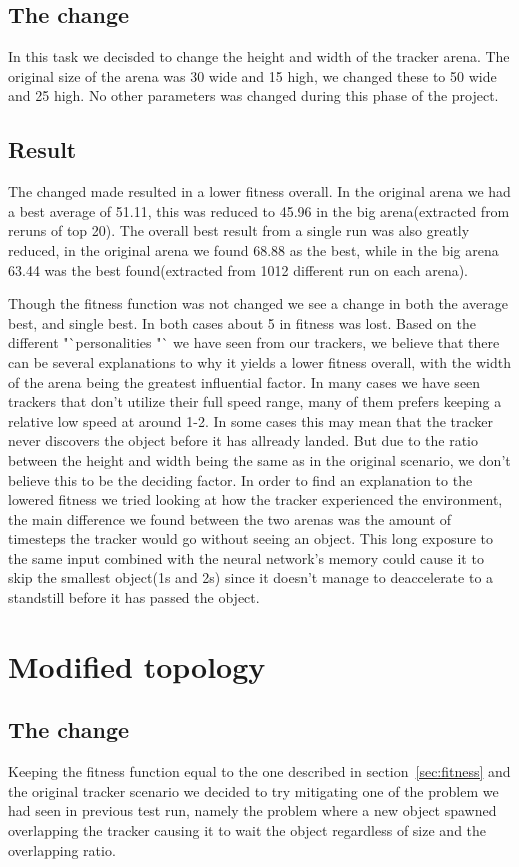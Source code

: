 \documentclass[10pt]{article}
\begin{document}
	\subsection{The change}
		In this task we decisded to change the height and width of the tracker arena. The original size of the arena was 30 wide and 15 high, we changed these to 50 wide and 25 high. No other parameters was changed during this phase of the project. 
	\subsection{Result}
		The changed made resulted in a lower fitness overall. In the original arena we had a best average of 51.11, this was reduced to 45.96 in the big arena(extracted from reruns of top 20). The overall best result from a single run was also greatly reduced, in the original arena we found 68.88 as the best, while in the big arena 63.44 was the best found(extracted from 1012 different run on each arena). 
		
		Though the fitness function was not changed we see a change in both the average best, and single best. In both cases about 5 in fitness was lost. Based on the different "`personalities "` we have seen from our trackers, we believe that there can be several explanations to why it yields a lower fitness overall, with the width of the arena being the greatest influential factor. In many cases we have seen trackers that don't utilize their full speed range, many of them prefers keeping a relative low speed at around 1-2. In some cases this may mean that the tracker never discovers the object before it has allready landed. But due to the ratio between the height and width being the same as in the original scenario, we don't believe this to be the deciding factor. In order to find an explanation to the lowered fitness we tried looking at how the tracker experienced the environment, the main difference we found between the two arenas was the amount of timesteps the tracker would go without seeing an object. This long exposure to the same input combined with the neural network's memory could cause it to skip the smallest object(1s and 2s) since it doesn't manage to deaccelerate to a standstill before it has passed the object. 
		
\section{Modified topology}
	\subsection{The change}
		Keeping the fitness function equal to the one described in section~\ref{sec:fitness} and the original tracker scenario we decided to try mitigating one of the problem we had seen in previous test run, namely the problem where a new object spawned overlapping the tracker causing it to wait the object regardless of size and the overlapping ratio. 
		
\end{document}
